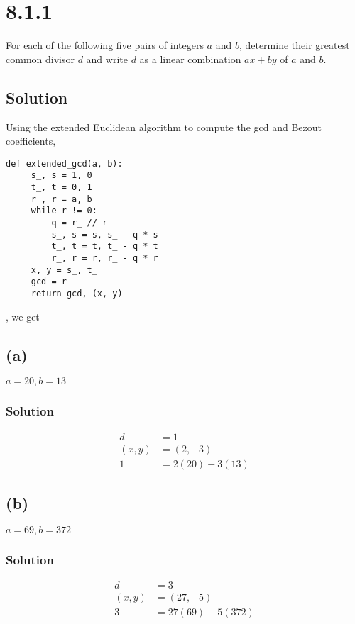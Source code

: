 \documentclass[fleqn]{article}
\begin{document}
    \section{8.1.1}
    For each of the following five pairs of integers $a$ and $b$, determine their greatest common divisor $d$ and write $d$ as a linear combination $ax + by$ of $a$ and $b$.
        
        \subsection{Solution}
        Using the extended Euclidean algorithm to compute the gcd and Bezout coefficients,
        \begin{verbatim}
def extended_gcd(a, b):
     s_, s = 1, 0
     t_, t = 0, 1
     r_, r = a, b
     while r != 0:
         q = r_ // r
         s_, s = s, s_ - q * s
         t_, t = t, t_ - q * t
         r_, r = r, r_ - q * r
     x, y = s_, t_
     gcd = r_
     return gcd, (x, y)
        \end{verbatim}, we get
        
        \subsection{(a)}
        $a = 20, b = 13$
            
            \subsubsection{Solution}
            \begin{align}
                d &= 1 \\
                (x, y) &= (2, -3) \\
                1 &= 2(20) - 3(13)
            \end{align}
        
        \subsection{(b)}
        $a = 69, b = 372$
            
            \subsubsection{Solution}
            \begin{align}
                d &= 3 \\
                (x, y) &= (27, -5) \\
                3 &= 27(69) - 5(372)
            \end{align}
        
\end{document}
